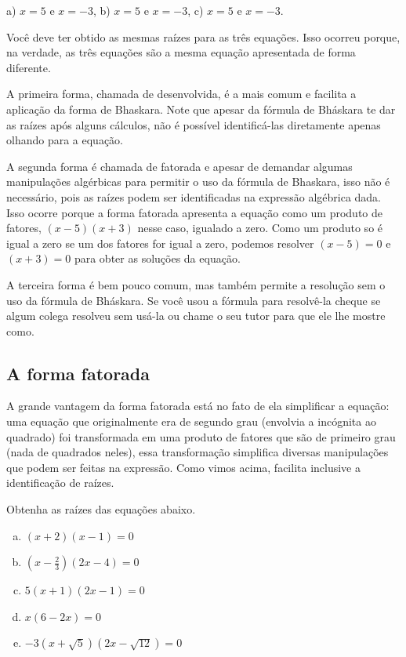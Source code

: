 \documentclass[main.tex]{subfiles}
\begin{document}
\begin{gabarito}
	\begin{gabaritoQuestao}
		a) $x=5$ e $x=-3$, b) $x=5$ e $x=-3$, c) $x=5$ e $x=-3$.
	\end{gabaritoQuestao}
\end{gabarito}

Você deve ter obtido as mesmas raízes para as três equações. Isso ocorreu porque, na verdade, as três equações são a mesma equação apresentada de forma diferente.

A primeira forma, chamada de desenvolvida, é a mais comum e facilita a aplicação da forma de Bhaskara. Note que apesar da fórmula de Bháskara te dar as raízes após alguns cálculos, não é possível identificá-las diretamente apenas olhando para a equação.

A segunda forma é chamada de fatorada e apesar de demandar algumas manipulações algérbicas para permitir o uso da fórmula de Bhaskara, isso não é necessário, pois as raízes podem ser identificadas na expressão algébrica dada. Isso ocorre porque a forma fatorada apresenta a equação como um produto de fatores, $(x-5)(x+3)$ nesse caso, igualado a zero. Como um produto so é igual a zero se um dos fatores for igual a zero, podemos resolver $(x-5)=0$ e $(x+3)=0$ para obter as soluções da equação.

A terceira forma é bem pouco comum, mas também permite a resolução sem o uso da fórmula de Bháskara. Se você usou a fórmula para resolvê-la cheque se algum colega resolveu sem usá-la ou chame o seu tutor para que ele lhe mostre como.

\subsection*{A forma fatorada}

A grande vantagem da forma fatorada está no fato de ela simplificar a equação: uma equação que originalmente era de segundo grau (envolvia a incógnita ao quadrado) foi transformada em uma produto de fatores que são de primeiro grau (nada de quadrados neles), essa transformação simplifica diversas manipulações que podem ser feitas na expressão. Como vimos acima, facilita inclusive a identificação de raízes.

\begin{questao}
Obtenha as raízes das equações abaixo.
\begin{enumerate}[a)]
\item $(x+2)(x-1)=0$
\item $(x-\frac{2}{3})(2x-4)=0$
\item $5(x+1)(2x-1)=0$
\item $x(6-2x)=0$
\item $-3(x+\sqrt{5})(2x-\sqrt{12})=0$
\end{enumerate}
\end{questao}
\end{document}
